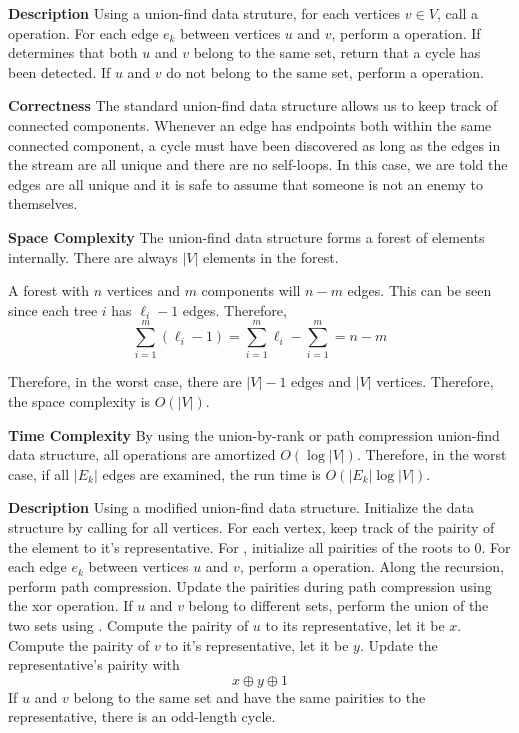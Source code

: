\documentclass[12pt,twoside]{article}
\begin{document}
\begin{problems}
\begin{problemparts}
\end{problemparts}

\newpage
\problem  %

\begin{problemparts}

\problempart %

{\bf Description} Using a union-find data struture, for each vertices $v \in
V$, call a  operation. For each edge $e_k$ between vertices
$u$ and $v$, perform a  operation. If 
determines that both $u$ and $v$ belong to the same set, return that a cycle
has been detected. If $u$ and $v$ do not belong to the same set, perform a
 operation.

{\bf Correctness} The standard union-find data structure allows us to keep
track of connected components. Whenever an edge has endpoints both within the
same connected component, a cycle must have been discovered as long as the
edges in the stream are all unique and there are no self-loops. In this case,
we are told the edges are all unique and it is safe to assume that someone is
not an enemy to themselves.

{\bf Space Complexity} The union-find data structure forms a forest of
elements internally. There are always $|V|$ elements in the forest. 

A forest with $n$ vertices and $m$ components will $n - m$ edges. This can be
seen since each tree $i$ has $\ell_i - 1$ edges. Therefore,
$$ \sum_{i = 1}^m (\ell_i - 1) = \sum_{i = 1}^m \ell_i - \sum_{i = 1}^m = n -
m $$

Therefore, in the worst case, there are $|V| - 1$ edges and $|V|$ vertices.
Therefore, the space complexity is $O(|V|)$.

{\bf Time Complexity} By using the union-by-rank or path compression
union-find data structure, all operations are amortized $O(\log |V|)$.
Therefore, in the worst case, if all $|E_k|$ edges are examined, the run time
is $O(|E_k| \log |V|)$.

\problempart %

{\bf Description} Using a modified union-find data structure. Initialize the
data structure by calling  for all vertices. For each
vertex, keep track of the pairity of the element to it's representative. For
, initialize all pairities of the roots to $0$. For each
edge $e_k$ between vertices $u$ and $v$, perform a 
operation. Along the recursion, perform path compression. Update the
pairities during path compression using the xor operation. If $u$ and $v$
belong to different sets, perform the union of the two sets using
. Compute the pairity of $u$ to its representative, let it be
$x$. Compute the pairity of $v$ to it's representative, let it be $y$. Update
the representative's pairity with
$$ x \oplus y \oplus 1 $$
If $u$ and $v$ belong to the same set and have the same pairities to the
representative, there is an odd-length cycle.


\end{problemparts}
\end{problems}
\end{document}
